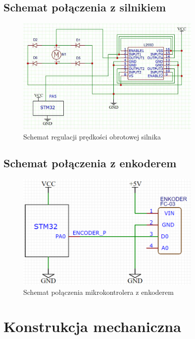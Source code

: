 \documentclass[10pt, a4paper]{article}
\begin{document}
	\subsection{Schemat połączenia z silnikiem}	
	\begin{figure}[H]
		\centering
		\includegraphics[width=0.8\textwidth]{figures/silnik.jpg}
		\caption{Schemat regulacji prędkości obrotowej silnika}
		\label{fig:KonfiguracjaPWM}
	\end{figure}
	
	\subsection{Schemat połączenia z enkoderem}
	\begin{figure}[H]
		\centering
		\includegraphics[width=0.8\textwidth]{figures/enkoder.png}
		\caption{Schemat połączenia mikrokontrolera z enkoderem}
		\label{fig:Enkoder}
	\end{figure}
\section{Konstrukcja mechaniczna}
\end{document}
